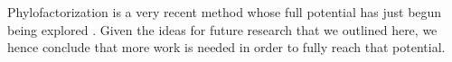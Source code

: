 Phylofactorization is a very recent method whose full potential has just begun being explored \cite{Washburne2019}.
Given the ideas for future research that we outlined here,
we hence conclude that more work is needed in order to fully reach that potential.

%





